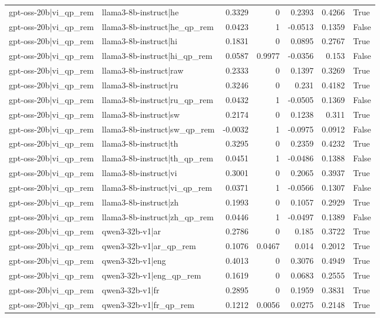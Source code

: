 \begin{table}
\begin{tabular}{l l r r r r l}
gpt-oss-20b|vi_qp_rem & llama3-8b-instruct|he & 0.3329 & 0 & 0.2393 & 0.4266 & True \\
gpt-oss-20b|vi_qp_rem & llama3-8b-instruct|he_qp_rem & 0.0423 & 1 & -0.0513 & 0.1359 & False \\
gpt-oss-20b|vi_qp_rem & llama3-8b-instruct|hi & 0.1831 & 0 & 0.0895 & 0.2767 & True \\
gpt-oss-20b|vi_qp_rem & llama3-8b-instruct|hi_qp_rem & 0.0587 & 0.9977 & -0.0356 & 0.153 & False \\
gpt-oss-20b|vi_qp_rem & llama3-8b-instruct|raw & 0.2333 & 0 & 0.1397 & 0.3269 & True \\
gpt-oss-20b|vi_qp_rem & llama3-8b-instruct|ru & 0.3246 & 0 & 0.231 & 0.4182 & True \\
gpt-oss-20b|vi_qp_rem & llama3-8b-instruct|ru_qp_rem & 0.0432 & 1 & -0.0505 & 0.1369 & False \\
gpt-oss-20b|vi_qp_rem & llama3-8b-instruct|sw & 0.2174 & 0 & 0.1238 & 0.311 & True \\
gpt-oss-20b|vi_qp_rem & llama3-8b-instruct|sw_qp_rem & -0.0032 & 1 & -0.0975 & 0.0912 & False \\
gpt-oss-20b|vi_qp_rem & llama3-8b-instruct|th & 0.3295 & 0 & 0.2359 & 0.4232 & True \\
gpt-oss-20b|vi_qp_rem & llama3-8b-instruct|th_qp_rem & 0.0451 & 1 & -0.0486 & 0.1388 & False \\
gpt-oss-20b|vi_qp_rem & llama3-8b-instruct|vi & 0.3001 & 0 & 0.2065 & 0.3937 & True \\
gpt-oss-20b|vi_qp_rem & llama3-8b-instruct|vi_qp_rem & 0.0371 & 1 & -0.0566 & 0.1307 & False \\
gpt-oss-20b|vi_qp_rem & llama3-8b-instruct|zh & 0.1993 & 0 & 0.1057 & 0.2929 & True \\
gpt-oss-20b|vi_qp_rem & llama3-8b-instruct|zh_qp_rem & 0.0446 & 1 & -0.0497 & 0.1389 & False \\
gpt-oss-20b|vi_qp_rem & qwen3-32b-v1|ar & 0.2786 & 0 & 0.185 & 0.3722 & True \\
gpt-oss-20b|vi_qp_rem & qwen3-32b-v1|ar_qp_rem & 0.1076 & 0.0467 & 0.014 & 0.2012 & True \\
gpt-oss-20b|vi_qp_rem & qwen3-32b-v1|eng & 0.4013 & 0 & 0.3076 & 0.4949 & True \\
gpt-oss-20b|vi_qp_rem & qwen3-32b-v1|eng_qp_rem & 0.1619 & 0 & 0.0683 & 0.2555 & True \\
gpt-oss-20b|vi_qp_rem & qwen3-32b-v1|fr & 0.2895 & 0 & 0.1959 & 0.3831 & True \\
gpt-oss-20b|vi_qp_rem & qwen3-32b-v1|fr_qp_rem & 0.1212 & 0.0056 & 0.0275 & 0.2148 & True \\

\end{tabular}
\end{table}
